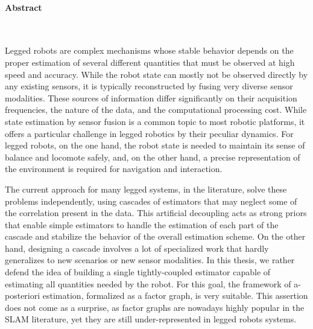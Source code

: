 \newpage

\noindent\makebox[\linewidth]{\rule{0.6\textwidth}{2pt}}

\small

\paragraph{Abstract}~

Legged robots are complex mechanisms whose stable behavior depends on the proper estimation of several different quantities that must be observed at 
high speed and accuracy. While the robot state can mostly not be observed directly by any existing sensors, it is typically reconstructed by fusing very 
diverse sensor modalities.
These sources of information differ significantly on their acquisition frequencies, the nature of the data, and the computational processing cost. 
While state estimation by sensor fusion is a common topic to most robotic platforms, it offers a particular challenge in legged robotics by their peculiar dynamics.
For legged robots, on the one hand, the robot state is needed to maintain its sense of balance and locomote safely, and, on the other hand, a precise representation 
of the environment is required for navigation and interaction. 

The current approach for many legged systems, in the literature, solve
these problems independently, using cascades of estimators that may neglect some of the correlation present in the data.
This artificial decoupling acts as strong priors that enable simple estimators to handle the estimation of each part of the cascade and stabilize 
the behavior of the overall estimation scheme. On the other hand, designing a cascade involves a lot of specialized work that hardly generalizes to new 
scenarios or new sensor modalities.
In this thesis, we rather defend the idea of building a single tightly-coupled estimator capable of estimating all quantities needed by the robot. 
For this goal, the framework of a-posteriori estimation, formalized as a factor graph, is very suitable. This assertion does not come as a surprise, 
as factor graphs are nowadays highly popular in the SLAM literature, yet they are still under-represented in legged robots systems.

